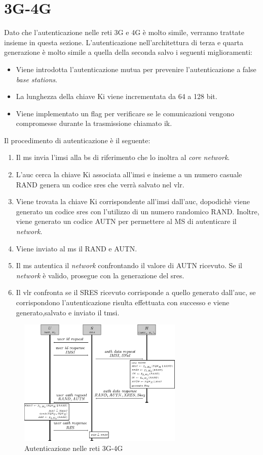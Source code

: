 \section{3G-4G}
Dato che l'autenticazione nelle reti 3G e 4G è molto simile, verranno trattate insieme in questa sezione.
L'autenticazione nell'architettura di terza e quarta generazione è molto simile a quella della seconda salvo i seguenti miglioramenti:
\begin{itemize}
    \item Viene introdotta l'autenticazione mutua per prevenire l'autenticazione a false \textit{base stations}.
    \item La lunghezza della chiave Ki viene incrementata da 64 a 128 bit.
    \item Viene implementato un flag per verificare se le comunicazioni vengono compromesse durante la trasmissione chiamato \gls{ik}.
\end{itemize}
Il procedimento di autenticazione è il seguente\cite{4g-auth}:
\begin{enumerate}
    \item Il \gls{ms} invia l'\gls{imsi} alla \gls{bs} di riferimento che lo inoltra al \textit{core network}.
    \item L'\gls{auc} cerca la chiave Ki associata all'\gls{imsi} e insieme a un numero casuale RAND genera un codice \gls{sres} che verrà
    salvato nel \gls{vlr}.
    \item Viene trovata la chiave Ki corrispondente all'\gls{imsi} dall'\gls{auc}, dopodichè viene generato un codice \gls{sres} con l'utilizzo di un numero randomico RAND.
    Inoltre, viene generato un codice AUTN per permettere al MS di autenticare il \textit{network}.
    \item Viene inviato al \gls{ms} il RAND e AUTN.
    \item Il \gls{ms} autentica il \textit{network} confrontando il valore di AUTN ricevuto. Se il \textit{network} è valido, prosegue con la generazione del \gls{sres}.
    \item Il \gls{vlr} confronta se il SRES ricevuto corrisponde a quello generato dall'\gls{auc}, se corrispondono l'autenticazione risulta
    effettuata con successo e viene generato,salvato e inviato il \gls{tmsi}.
\end{enumerate}
\begin{figure}[h]
    \centering
    \includegraphics[width=0.7\textwidth]{images/auth-3g.png}
    \caption{Autenticazione nelle reti 3G-4G}
\end{figure}


